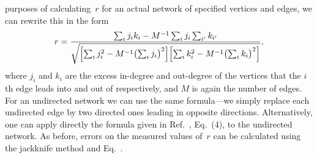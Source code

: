 \documentclass[twocolumn,pre]{revtex4}
\begin{document}
purposes of calculating~$r$ for an actual network of specified vertices and
edges, we can rewrite this in the form
\begin{equation}
r = {\sum_i j_i k_i - M^{-1} \sum_i j_i \sum_{i'} k_{i'}\over
     \sqrt{\Bigl[\sum_i j_i^2 - M^{-1} \bigl(\sum_i j_i\bigr)^2\Bigr]
           \Bigl[\sum_i k_i^2 - M^{-1} \bigl(\sum_i k_i\bigr)^2\Bigr]}},
\end{equation}
where $j_i$ and $k_i$ are the excess in-degree and out-degree of the
vertices that the $i$th edge leads into and out of respectively, and $M$ is
again the number of edges.  For an undirected network we can use the same
formula---we simply replace each undirected edge by two directed ones
leading in opposite directions.  Alternatively, one can apply directly the
formula given in Ref.~, Eq.~(4), to the undirected
network.  As before, errors on the measured values of~$r$ can be calculated
using the jackknife method and Eq.~.
\end{document}
